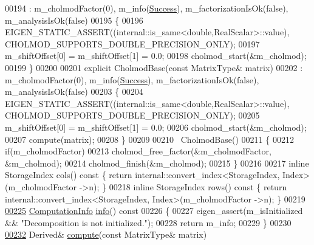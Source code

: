 \begin{DoxyCode}
00194       : m\_cholmodFactor(0), m\_info(\hyperlink{group__enums_gga85fad7b87587764e5cf6b513a9e0ee5ea52581b035f4b59c203b8ff999ef5fcea}{Success}), m\_factorizationIsOk(false), m\_analysisIsOk(false)
00195     \{
00196       EIGEN\_STATIC\_ASSERT((internal::is\_same<double,RealScalar>::value), 
      CHOLMOD\_SUPPORTS\_DOUBLE\_PRECISION\_ONLY);
00197       m\_shiftOffset[0] = m\_shiftOffset[1] = 0.0;
00198       cholmod\_start(&m\_cholmod);
00199     \}
00200 
00201     \textcolor{keyword}{explicit} CholmodBase(\textcolor{keyword}{const} MatrixType& matrix)
00202       : m\_cholmodFactor(0), m\_info(\hyperlink{group__enums_gga85fad7b87587764e5cf6b513a9e0ee5ea52581b035f4b59c203b8ff999ef5fcea}{Success}), m\_factorizationIsOk(false), m\_analysisIsOk(false)
00203     \{
00204       EIGEN\_STATIC\_ASSERT((internal::is\_same<double,RealScalar>::value), 
      CHOLMOD\_SUPPORTS\_DOUBLE\_PRECISION\_ONLY);
00205       m\_shiftOffset[0] = m\_shiftOffset[1] = 0.0;
00206       cholmod\_start(&m\_cholmod);
00207       compute(matrix);
00208     \}
00209 
00210     ~CholmodBase()
00211     \{
00212       \textcolor{keywordflow}{if}(m\_cholmodFactor)
00213         cholmod\_free\_factor(&m\_cholmodFactor, &m\_cholmod);
00214       cholmod\_finish(&m\_cholmod);
00215     \}
00216     
00217     \textcolor{keyword}{inline} StorageIndex cols()\textcolor{keyword}{ const }\{ \textcolor{keywordflow}{return} internal::convert\_index<StorageIndex, Index>(m\_cholmodFactor
      ->n); \}
00218     \textcolor{keyword}{inline} StorageIndex rows()\textcolor{keyword}{ const }\{ \textcolor{keywordflow}{return} internal::convert\_index<StorageIndex, Index>(m\_cholmodFactor
      ->n); \}
00219     
\hyperlink{class_eigen_1_1_cholmod_base_ada4cc43c64767d186fcb8997440cc753}{00225}     \hyperlink{group__enums_ga85fad7b87587764e5cf6b513a9e0ee5e}{ComputationInfo} \hyperlink{class_eigen_1_1_cholmod_base_ada4cc43c64767d186fcb8997440cc753}{info}()\textcolor{keyword}{ const}
00226 \textcolor{keyword}{    }\{
00227       eigen\_assert(m\_isInitialized && \textcolor{stringliteral}{"Decomposition is not initialized."});
00228       \textcolor{keywordflow}{return} m\_info;
00229     \}
00230 
\hyperlink{class_eigen_1_1_cholmod_base_abaf5be01b1e3035a4de0b19f5b63549e}{00232}     Derived& \hyperlink{class_eigen_1_1_cholmod_base_abaf5be01b1e3035a4de0b19f5b63549e}{compute}(\textcolor{keyword}{const} MatrixType& matrix)

\end{DoxyCode}
